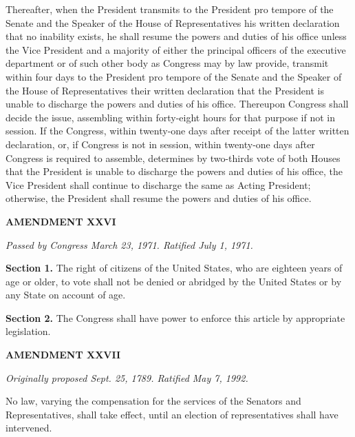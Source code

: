 Thereafter, when the President transmits to the President pro tempore of the Senate and the Speaker of the House of Representatives his written declaration that no inability exists, he shall resume the powers and duties of his office unless the Vice President and a majority of either the principal officers of the executive department or of such other body as Congress may by law provide, transmit within four days to the President pro tempore of the Senate and the Speaker of the House of Representatives their written declaration that the President is unable to discharge the powers and duties of his office. Thereupon Congress shall decide the issue, assembling within forty-eight hours for that purpose if not in session. If the Congress, within twenty-one days after receipt of the latter written declaration, or, if Congress is not in session, within twenty-one days after Congress is required to assemble, determines by two-thirds vote of both Houses that the President is unable to discharge the powers and duties of his office, the Vice President shall continue to discharge the same as Acting President; otherwise, the President shall resume the powers and duties of his office.

\begin{center} 
\textbf{AMENDMENT XXVI}
\end{center} 

\textit{Passed by Congress March 23, 1971. Ratified July 1, 1971.}

\textbf{Section 1.}
The right of citizens of the United States, who are eighteen years of age or older, to vote shall not be denied or abridged by the United States or by any State on account of age.

\textbf{Section 2.}
The Congress shall have power to enforce this article by appropriate legislation.

\begin{center} 
\textbf{AMENDMENT XXVII}
\end{center} 

\textit{Originally proposed Sept. 25, 1789. Ratified May 7, 1992.}

No law, varying the compensation for the services of the Senators and Representatives, shall take effect, until an election of representatives shall have intervened.